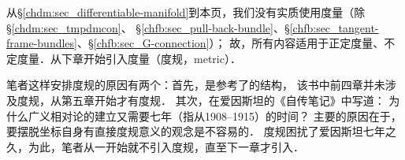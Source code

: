 从\S\ref{chdm:sec_differentiable-manifold}到本页，我们没有实质使用度量（除\S\ref{chdm:sec_tmpdmcon}、
\S\ref{chfb:sec_pull-back-bundle}、\S\ref{chfb:sec_tangent-frame-bundles}、\S\ref{chfb:sec_G-connection}）；
故，所有内容适用于正定度量、不定度量．从下章开始引入度量（度规，metric）．

笔者这样安排度规的原因有两个：首先，是参考了\parencite{cc2001-zh}的结构，
该书中前四章并未涉及度规，从第五章开始才有度规．
其次，在爱因斯坦的《自传笔记》\parencite[p.67]{einstein-1970}中写道：
{\kaishu 为什么广义相对论的建立又需要七年（指从1908--1915）的时间？
    主要的原因在于，要摆脱坐标自身有直接度规意义的观念是不容易的．}
度规困扰了爱因斯坦七年之久，为此，笔者从一开始就不引入度规，直至下一章才引入．




\endinput




